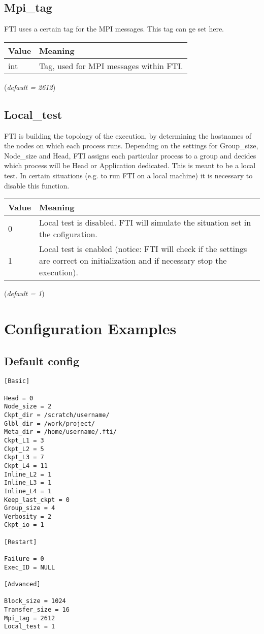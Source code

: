 \documentclass{refrep}
\begin{document}
\subsection{Mpi\_tag}\label{subsec:mpitag}
FTI uses a certain tag for the MPI messages. This tag can ge set here.
\begin{center}
\begin{tabular}[h!]{|p{}|p{}|}
\hline
\textbf{Value} & \textbf{Meaning} \\ \hline
int & Tag, used for MPI messages within FTI. \\ \hline
\end{tabular}
\end{center}
(\textit{default = 2612})
\subsection{Local\_test}\label{subsec:localtest}
FTI is building the topology of the execution, by determining the hostnames of the nodes on which each process runs. Depending on the settings for Group\_size, Node\_size and Head, FTI assigns each particular process to a group and decides which process will be Head or Application dedicated. This is meant to be a local test. In certain situations (e.g. to run FTI on a local machine) it is necessary to disable this function.
\begin{center}
\begin{tabular}[h!]{|p{}|p{}|}
\hline
\textbf{Value} & \textbf{Meaning} \\ \hline
0 & Local test is disabled. FTI will simulate the situation set in the cofiguration. \\ \hline
1 & Local test is enabled (notice: FTI will check if the settings are correct on initialization and if necessary stop the execution). \\ \hline
\end{tabular}
\end{center}
(\textit{default = 1})
\newpage
\section{Configuration Examples}\label{sec:configurationexamples}
\subsection{Default config}\label{subsec:configdefault}
\begin{center}
\begin{lstlisting}[frame=single]
[Basic]

Head = 0
Node_size = 2
Ckpt_dir = /scratch/username/
Glbl_dir = /work/project/
Meta_dir = /home/username/.fti/
Ckpt_L1 = 3
Ckpt_L2 = 5
Ckpt_L3 = 7
Ckpt_L4 = 11
Inline_L2 = 1
Inline_L3 = 1
Inline_L4 = 1
Keep_last_ckpt = 0
Group_size = 4
Verbosity = 2
Ckpt_io = 1

[Restart]

Failure = 0
Exec_ID = NULL

[Advanced]

Block_size = 1024
Transfer_size = 16
Mpi_tag = 2612
Local_test = 1

\end{lstlisting}
\end{center}
\end{document}
